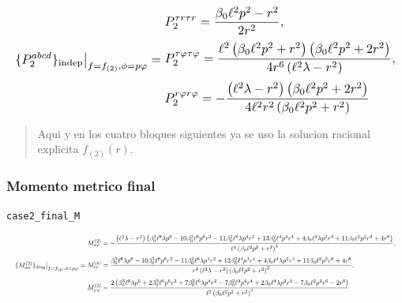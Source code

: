 \documentclass[11pt,a4paper]{article}
\begin{document}
\[
\resizebox{\textwidth}{!}{$\displaystyle \{P_2^{abcd}\}_{\mathrm{indep}}\big|_{f=f_{(2)},\phi=p\varphi} = \begin{aligned}&P_2^{{\tau}{r}{\tau}{r}}=\frac{\beta_{0} \ell^{2} p^{2} - r^{2}}{2 r^{2}},\\[2pt]&P_2^{{\tau}{\varphi}{\tau}{\varphi}}=\frac{\ell^{2} \left(\beta_{0} \ell^{2} p^{2} + r^{2}\right) \left(\beta_{0} \ell^{2} p^{2} + 2 r^{2}\right)}{4 r^{6} \left(\ell^{2} \lambda - r^{2}\right)},\\[2pt]&P_2^{{r}{\varphi}{r}{\varphi}}=- \frac{\left(\ell^{2} \lambda - r^{2}\right) \left(\beta_{0} \ell^{2} p^{2} + 2 r^{2}\right)}{4 \ell^{2} r^{2} \left(\beta_{0} \ell^{2} p^{2} + r^{2}\right)}\end{aligned}$}
\]

\begin{quote}\small Aqui y en los cuatro bloques siguientes ya se uso la solucion racional explicita \(f_{(2)}(r)\).\end{quote}

\subsubsection{Momento metrico final}

\noindent\texttt{case2\_final\_M}\par\nopagebreak[4]

\[
\resizebox{\textwidth}{!}{$\displaystyle \{M^{(2)}_{aa}\}_{\rm diag}\big|_{f=f_{(2)},\phi=p\varphi} = \begin{aligned}&M^{(2)}_{\tau\tau}=- \frac{\left(\ell^{2} \lambda - r^{2}\right) \left(\beta_{0}^{3} \ell^{8} \lambda p^{6} - 10 \beta_{0}^{3} \ell^{6} p^{6} r^{2} - 11 \beta_{0}^{2} \ell^{6} \lambda p^{4} r^{2} + 13 \beta_{0}^{2} \ell^{4} p^{4} r^{4} + 4 \beta_{0} \ell^{4} \lambda p^{2} r^{4} + 11 \beta_{0} \ell^{2} p^{2} r^{6} + 4 r^{8}\right)}{\ell^{4} \left(\beta_{0} \ell^{2} p^{2} + r^{2}\right)^{4}},\\[4pt]&M^{(2)}_{rr}=\frac{\beta_{0}^{3} \ell^{8} \lambda p^{6} - 10 \beta_{0}^{3} \ell^{6} p^{6} r^{2} - 11 \beta_{0}^{2} \ell^{6} \lambda p^{4} r^{2} + 13 \beta_{0}^{2} \ell^{4} p^{4} r^{4} + 4 \beta_{0} \ell^{4} \lambda p^{2} r^{4} + 11 \beta_{0} \ell^{2} p^{2} r^{6} + 4 r^{8}}{r^{4} \left(\ell^{2} \lambda - r^{2}\right) \left(\beta_{0} \ell^{2} p^{2} + r^{2}\right)^{2}},\\[4pt]&M^{(2)}_{\varphi\varphi}=\frac{2 \left(\beta_{0}^{3} \ell^{8} \lambda p^{6} + 2 \beta_{0}^{3} \ell^{6} p^{6} r^{2} + 7 \beta_{0}^{2} \ell^{6} \lambda p^{4} r^{2} - 7 \beta_{0}^{2} \ell^{4} p^{4} r^{4} + 2 \beta_{0} \ell^{4} \lambda p^{2} r^{4} - 7 \beta_{0} \ell^{2} p^{2} r^{6} - 2 r^{8}\right)}{\ell^{2} \left(\beta_{0} \ell^{2} p^{2} + r^{2}\right)^{3}}\end{aligned}$}
\]
\end{document}
